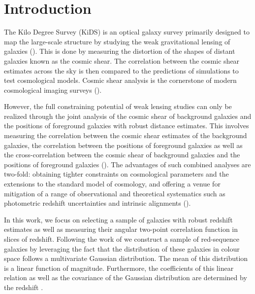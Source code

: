 \documentclass{aa}
\numberwithin{equation}{section}
\begin{document}
\maketitle


\section{Introduction}

The Kilo Degree Survey (KiDS) is an optical galaxy survey primarily designed to map the large-scale structure by studying the weak gravitational lensing of galaxies (\citealt{kuijken2015, hendrick2017, kuijken2019, hendrik2020}). This is done by measuring the distortion of the shapes of distant galaxies known as the cosmic shear. The correlation between the cosmic shear estimates across the sky is then compared to the predictions of simulations to test cosmological models. Cosmic shear analysis is the cornerstone of modern cosmological imaging surveys (\citealt{heymans2013,jee2016,hendrick2017,joudaki2017,troxel2017,joudaki2019, hikage2019}). 

However, the full constraining potential of weak lensing studies can only be realized through the joint analysis of the cosmic shear of background galaxies and the positions of foreground galaxies with robust distance estimates. This involves measuring the correlation between the cosmic shear estimates of the background galaxies, the correlation between the positions of foreground galaxies as well as the cross-correlation between the cosmic shear of background galaxies and the positions of foreground galaxies (\citealt{cacciato2013, cosmolike, des_y1_cosmology, elvin2017, edo2018, prat2017}). 
The advantages of such combined analyses are two-fold: obtaining tighter constraints on cosmological parameters and the extensions to the standard model of cosmology, and offering a venue for mitigation of a range of observational and theoretical systematics such as photometric redshift uncertainties and intrinsic alignments (\citealt{edo2016, joudaki2018, sam2019}). 

In this work, we focus on selecting a sample of galaxies with robust redshift estimates as well as measuring their angular two-point correlation function in slices of redshift. Following the work of \citet{vakili2019} we construct a sample of red-sequence galaxies by leveraging the fact that the distribution of these galaxies in colour space follows a multivariate Gaussian distribution. The mean of this distribution is a linear function of magnitude. Furthermore, the coefficients of this linear relation as well as the covariance of the Gaussian distribution are determined by the redshift \citep[e.g.][]{bower1992,ellis1997,gladders1998,stanford1998}. 
\end{document}
